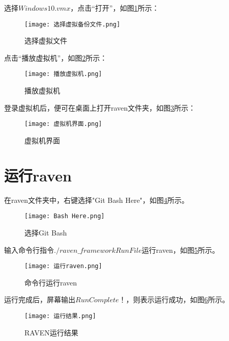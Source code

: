 选择$ Windows 10.vmx $，点击“打开”，如图\ref{选择虚拟文件}所示：
\begin{figure}[ht]
    \centering
    \texttt{[image: 选择虚拟备份文件.png]}
    \caption{选择虚拟文件}
    \label{选择虚拟文件}
\end{figure}

点击“播放虚拟机”，如图\ref{播放虚拟机}所示：
\begin{figure}[ht]
    \centering
    \texttt{[image: 播放虚拟机.png]}
    \caption{播放虚拟机}
    \label{播放虚拟机}
\end{figure}

登录虚拟机后，便可在桌面上打开raven文件夹，如图\ref{虚拟机界面}所示：
\begin{figure}[htpb]
    \centering
    \texttt{[image: 虚拟机界面.png]}
    \caption{虚拟机界面}
    \label{虚拟机界面}
\end{figure}

\section{运行raven}

在raven文件夹中，右键选择"Git Bash Here"，如图\ref{选择Git Bash}所示。
\begin{figure}
    \centering
    \texttt{[image: Bash Here.png]}
    \caption{选择Git Bash}
    \label{选择Git Bash}
\end{figure}

输入命令行指令$ ./raven\_framework RunFile $运行raven，如图\ref{命令行运行raven}所示。
\begin{figure}[ht]
    \centering
    \texttt{[image: 运行raven.png]}
    \caption{命令行运行raven}
    \label{命令行运行raven}
\end{figure}

运行完成后，屏幕输出$ Run Complete！ $，则表示运行成功，如图\ref{RAVEN运行结果}所示。
\begin{figure}[ht]
    \centering
    \texttt{[image: 运行结果.png]}
    \caption{RAVEN运行结果}
    \label{RAVEN运行结果}
\end{figure}